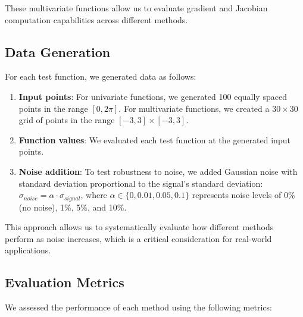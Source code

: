 \documentclass[11pt,a4paper]{article}
\begin{document}
These multivariate functions allow us to evaluate gradient and Jacobian computation capabilities across different methods.

\subsection{Data Generation}

For each test function, we generated data as follows:

\begin{enumerate}
    \item \textbf{Input points}: For univariate functions, we generated 100 equally spaced points in the range $[0, 2\pi]$. For multivariate functions, we created a $30 \times 30$ grid of points in the range $[-3, 3] \times [-3, 3]$.
    
    \item \textbf{Function values}: We evaluated each test function at the generated input points.
    
    \item \textbf{Noise addition}: To test robustness to noise, we added Gaussian noise with standard deviation proportional to the signal's standard deviation: $\sigma_{noise} = \alpha \cdot \sigma_{signal}$, where $\alpha \in \{0, 0.01, 0.05, 0.1\}$ represents noise levels of 0\% (no noise), 1\%, 5\%, and 10\%.
\end{enumerate}

This approach allows us to systematically evaluate how different methods perform as noise increases, which is a critical consideration for real-world applications.

\subsection{Evaluation Metrics}

We assessed the performance of each method using the following metrics:
\end{document}

